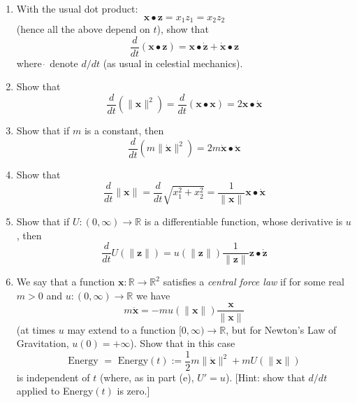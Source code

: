 \documentclass{article}
\newcommand{\R}{{\mathbb R}}
\begin{document}
\begin{enumerate}
	\item With the usual dot product:
		\[
			\mathbf{x} \bullet \mathbf{z} = x_1z_1 = x_2z_2
		\]
		(hence all the above depend on $t$), show that
		\[
			\frac{d}{dt}(\mathbf{x}\bullet\mathbf{z}) =
			\mathbf{x} \bullet \dot{\mathbf{z}} + \dot{\mathbf{x}}\bullet\mathbf{z}
		\]
		where $\dot{\,}$ denote $d/dt$ (as usual in celestial mechanics).
	\item Show that
		\[
			\frac{d}{dt}(\lVert \mathbf{x}\rVert^2)
			= \frac{d}{dt}(\mathbf{x} \bullet \mathbf{x}) = 2\mathbf{x}\bullet\dot{\mathbf{x}}
		\]
	\item Show that if $m$ is a constant, then
		\[
			\frac{d}{dt}(m\lVert \dot{\mathbf{x}}\rVert^2) =
			2m \dot{\mathbf{x}} \bullet \ddot{\mathbf{x}}
		\]
	\item Show that
		\[
			\frac{d}{dt}\lVert \mathbf{x} \rVert =
			\frac{d}{dt}\sqrt{x_1^2 + x_2^2} =
			\frac{1}{\lVert \mathbf{x}\rVert} \mathbf{x} \bullet \dot{\mathbf{x}}
		\]
	\item Show that if $U \colon (0,\infty) \to \R$ is a differentiable function,
		whose derivative is $u$, then
		\[
			\frac{d}{dt}U(\lVert \mathbf{z} \rVert)
			= u(\lVert \mathbf{z} \rVert)\frac{1}{\lVert \mathbf{z} \rVert}
			\mathbf{z}\bullet\dot{\mathbf{z}}
		\]
	\item We say that a function $\mathbf{x} \colon \R \to \R^2$
		satisfies a \emph{central force law} if for some real $m > 0$
		and $u \colon (0, \infty) \to \R$ we have
		\begin{equation}\label{central force}
			m\ddot{\mathbf{x}} = -mu(\lVert \mathbf{x} \rVert)
			\frac{\mathbf{x}}{\lVert \mathbf{x} \rVert}
		\end{equation}
		(at times $u$ may extend to a function $[0,\infty) \to \R$,
		but for Newton's Law of Gravitation, $u(0) = + \infty$).
		Show that in this case
		\begin{equation}\label{conservation}
			\text{Energy } = \text{ Energy}(t)
			:= \frac{1}{2} m\lVert \dot{\mathbf{x}}\rVert^2 
			+ mU(\lVert \mathbf{x} \rVert)
		\end{equation}
		is independent of $t$ (where, as in part (e), $U' = u$).
		[Hint: show that $d/dt$ applied to Energy$(t)$ is zero.]
\end{enumerate}
\end{document}
